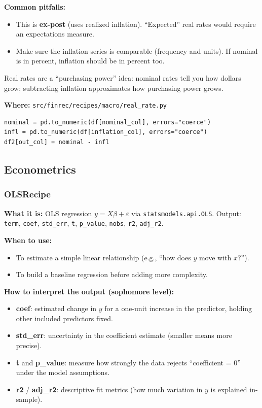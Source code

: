\documentclass[11pt,a4paper]{article}
\begin{document}
\textbf{Common pitfalls:}
\begin{itemize}[leftmargin=2em]
  \item This is \textbf{ex-post} (uses realized inflation). ``Expected'' real rates would require an expectations measure.
  \item Make sure the inflation series is comparable (frequency and units). If nominal is in percent, inflation should be in percent too.
\end{itemize}

\begin{intuitionbox}
Real rates are a ``purchasing power'' idea: nominal rates tell you how dollars grow; subtracting inflation approximates how purchasing power grows.
\end{intuitionbox}

\textbf{Where:} \texttt{src/finrec/recipes/macro/real\_rate.py}

\begin{lstlisting}
nominal = pd.to_numeric(df[nominal_col], errors="coerce")
infl = pd.to_numeric(df[inflation_col], errors="coerce")
df2[out_col] = nominal - infl
\end{lstlisting}

\subsection{Econometrics}

\subsubsection{OLSRecipe}\label{sec:ols}

\textbf{What it is:} OLS regression $y = X\beta + \varepsilon$ via \texttt{statsmodels.api.OLS}. Output: \texttt{term}, \texttt{coef}, \texttt{std\_err}, \texttt{t}, \texttt{p\_value}, \texttt{nobs}, \texttt{r2}, \texttt{adj\_r2}.

\textbf{When to use:}
\begin{itemize}[leftmargin=2em]
  \item To estimate a simple linear relationship (e.g., ``how does \(y\) move with \(x\)?'').
  \item To build a baseline regression before adding more complexity.
\end{itemize}

\textbf{How to interpret the output (sophomore level):}
\begin{itemize}[leftmargin=2em]
  \item \textbf{coef}: estimated change in \(y\) for a one-unit increase in the predictor, holding other included predictors fixed.
  \item \textbf{std\_err}: uncertainty in the coefficient estimate (smaller means more precise).
  \item \textbf{t} and \textbf{p\_value}: measure how strongly the data rejects ``coefficient = 0'' under the model assumptions.
  \item \textbf{r2} / \textbf{adj\_r2}: descriptive fit metrics (how much variation in \(y\) is explained in-sample).
\end{itemize}
\end{document}
